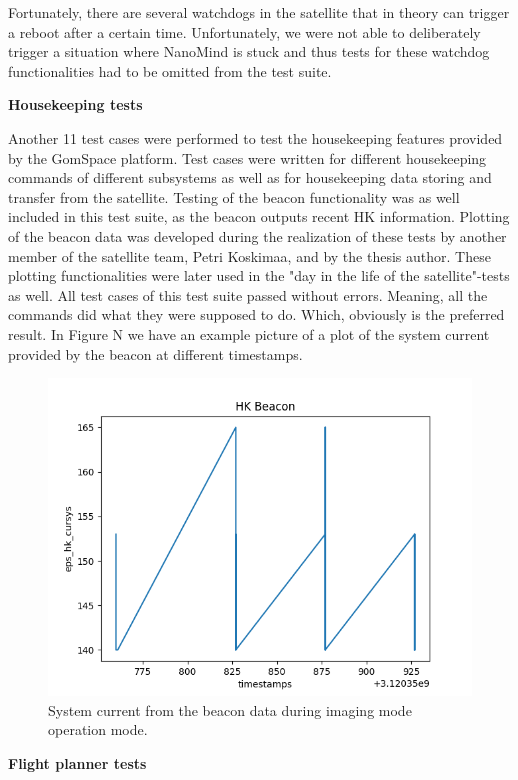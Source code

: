 \documentclass[english,12pt,a4paper,pdftex,elec,utf8]{aaltothesis}
\begin{document}
Fortunately, there are several watchdogs in the satellite that in theory can trigger a reboot after a certain time. Unfortunately, we were not able to deliberately trigger a situation where NanoMind is stuck and thus tests for these watchdog functionalities had to be omitted from the test suite.\par 
\textbf{Housekeeping tests}
\par 
Another 11 test cases were performed to test the housekeeping features provided by the GomSpace platform. Test cases were written for different housekeeping commands of different subsystems as well as for housekeeping data storing and transfer from the satellite. Testing of the beacon functionality was as well included in this test suite, as the beacon outputs recent HK information. Plotting of the beacon data was developed during the realization of these tests by another member of the satellite team, Petri Koskimaa, and by the thesis author. These plotting functionalities were later used in the "day in the life of the satellite"-tests as well. All test cases of this test suite passed without errors. Meaning, all the commands did what they were supposed to do. Which, obviously is the preferred result. In Figure N we have an example picture of a plot of the system current provided by the beacon at different timestamps.\par 
\begin{figure}[h!]
\includegraphics[scale=0.6]{hk_plot_cam_op2}
\caption{System current from the beacon data during imaging mode operation mode.}
\end{figure}
\textbf{Flight planner tests}
\par 
\end{document}
